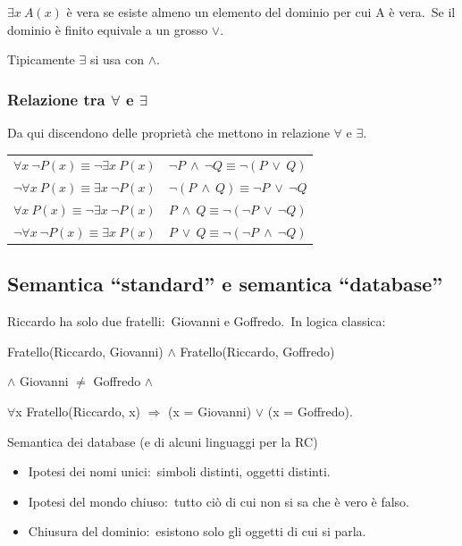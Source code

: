 $\exists x\ A(x)$ è vera se esiste almeno un elemento del dominio per cui A è vera.\
Se il dominio è finito equivale a un grosso $\lor$.

Tipicamente $\exists$ si usa con $\land$.

\subsubsection{Relazione tra $\forall$ e $\exists$}

Da qui discendono delle proprietà che mettono in relazione $\forall$ e $\exists$.

\begin{table}[H]
	\centering
	\begin{tabular}{l l}
		$ \forall x\ \lnot P(x) \equiv \lnot\exists x\ P(x) $ & $ \lnot P\ \land\ \lnot Q \equiv \lnot (P\ \lor\ Q) $ \\
		$ \lnot\forall x\ P(x) \equiv \exists x\ \lnot P(x) $ & $ \lnot (P\ \land\ Q) \equiv \lnot P\ \lor\ \lnot Q $ \\
		$ \forall x\ P(x) \equiv \lnot\exists x\ \lnot P(x) $ & $ P\ \land\ Q \equiv \lnot (\lnot P\ \lor\ \lnot Q)$  \\
		$ \lnot\forall x\ \lnot P(x) \equiv \exists x\ P(x) $ & $ P\ \lor\ Q \equiv \lnot (\lnot P\ \land\ \lnot Q) $ \\
	\end{tabular}
\end{table}

\subsection{Semantica ``standard'' e semantica ``database''}

Riccardo ha solo due fratelli:\ Giovanni e Goffredo.\ In logica classica:

\begin{center}
	Fratello(Riccardo, Giovanni) $\land$ Fratello(Riccardo, Goffredo)

	$\land$ Giovanni $\neq$ Goffredo $\land$

	$\forall$x Fratello(Riccardo, x) $\Rightarrow$ (x = Giovanni) $\lor$ (x = Goffredo).
\end{center}

\noindent Semantica dei database (e di alcuni linguaggi per la RC)
\begin{itemize}
	\item Ipotesi dei nomi unici:\ simboli distinti, oggetti distinti.
	\item Ipotesi del mondo chiuso:\ tutto ciò di cui non si sa che è vero è falso.
	\item Chiusura del dominio:\ esistono solo gli oggetti di cui si parla.
\end{itemize}

